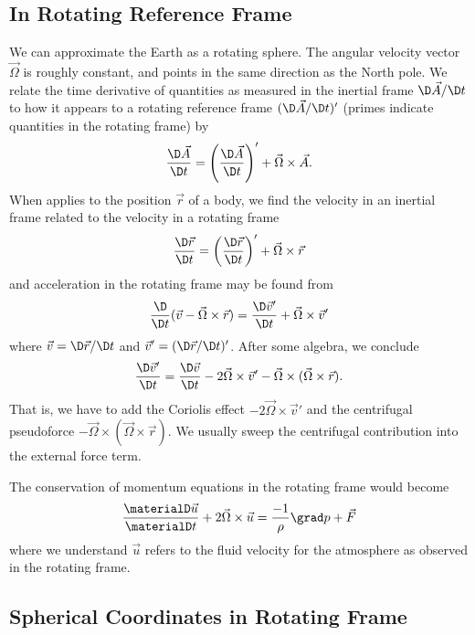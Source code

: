 \subsection{In Rotating Reference Frame}

We can approximate the Earth as a rotating sphere. The angular velocity
vector $\vec{\Omega}$ is roughly constant, and points in the same
direction as the North pole. We relate the time derivative of quantities
as measured in the inertial frame $\D\vec{A}/\D t$ to how it appears to a
rotating reference frame $(\D\vec{A}/\D t)'$ (primes indicate quantities
in the rotating frame) by
\begin{equation}
  \frac{\D\vec{A}}{\D t} = \left(\frac{\D\vec{A}}{\D t}\right)' + \vec{\Omega}\times\vec{A}.
\end{equation}
When applies to the position $\vec{r}$ of a body, we find the velocity
in an inertial frame related to the velocity in a rotating frame
\begin{equation}
  \frac{\D\vec{r}}{\D t} = \left(\frac{\D\vec{r}}{\D t}\right)' + \vec{\Omega}\times\vec{r}
\end{equation}
and acceleration in the rotating frame may be found from
\begin{equation}
  \frac{\D}{\D t}(\vec{v} - \vec{\Omega}\times\vec{r})
  = \frac{\D\vec{v}'}{\D t}+\vec{\Omega}\times\vec{v}'
\end{equation}
where $\vec{v} = \D\vec{r}/\D t$ and $\vec{v}' = (\D\vec{r}/\D t)'$.
After some algebra, we conclude
\begin{equation}
  \frac{\D\vec{v}'}{\D t}
  = \frac{\D \vec{v}}{\D t}
    - 2\vec{\Omega}\times\vec{v}'
    - \vec{\Omega}\times(\vec{\Omega}\times\vec{r}).
\end{equation}
That is, we have to add the Coriolis effect
$-2\vec{\Omega}\times\vec{v}'$ and the centrifugal pseudoforce
$-\vec{\Omega}\times(\vec{\Omega}\times\vec{r})$. We usually sweep the
centrifugal contribution into the external force term.

The conservation of momentum equations in the rotating frame would
become
\begin{equation}
  \frac{\materialD\vec{u}}{\materialD t} + 2\vec{\Omega}\times\vec{u}
  = \frac{-1}{\rho}\grad p + \vec{F}
\end{equation}
where we understand $\vec{u}$ refers to the fluid velocity for the
atmosphere as observed in the rotating frame.

\subsection{Spherical Coordinates in Rotating Frame}

